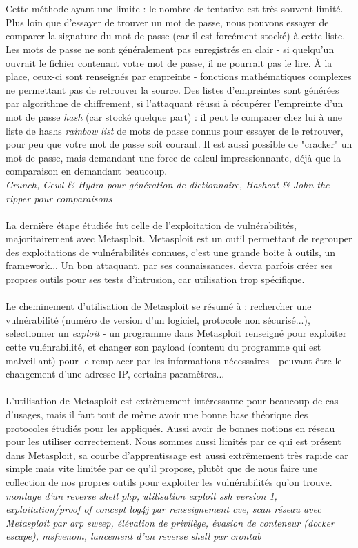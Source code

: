 \\ \\
Cette méthode ayant une limite : le nombre de tentative est très souvent limité. Plus loin que d'essayer de trouver un mot de passe, nous pouvons essayer de comparer la signature du mot de passe (car il est forcément stocké) à cette liste. Les mots de passe ne sont généralement pas enregistrés en clair - si quelqu'un ouvrait le fichier contenant votre mot de passe, il ne pourrait pas le lire. À la place, ceux-ci sont renseignés par empreinte - fonctions mathématiques complexes ne permettant pas de retrouver la source. Des listes d'empreintes sont générées par algorithme de chiffrement, si l'attaquant réussi à récupérer l'empreinte d'un mot de passe \textit{hash} (car stocké quelque part) : il peut le comparer chez lui à une liste de hashs \textit{rainbow list} de mots de passe connus pour essayer de le retrouver, pour peu que votre mot de passe soit courant. Il est aussi possible de "cracker" un mot de passe, mais demandant une force de calcul impressionnante, déjà que la comparaison en demandant beaucoup.
\\
\textit{Crunch, Cewl \& Hydra pour génération de dictionnaire, Hashcat \& John the ripper pour comparaisons}
\\ \\
La dernière étape étudiée fut celle de l'exploitation de vulnérabilités, majoritairement avec Metasploit. Metasploit est un outil permettant de regrouper des exploitations de vulnérabilités connues, c'est une grande boite à outils, un framework... Un bon attaquant, par ses connaissances, devra parfois créer ses propres outils pour ses tests d'intrusion, car utilisation trop spécifique.
\\ \\
Le cheminement d'utilisation de Metasploit se résumé à : rechercher une vulnérabilité (numéro de version d'un logiciel, protocole non sécurisé...), selectionner un \textit{exploit} - un programme dans Metasploit renseigné pour exploiter cette vulénrabilité, et changer son payload (contenu du programme qui est malveillant) pour le remplacer par les informations nécessaires - peuvant être le changement d'une adresse IP, certains paramètres...
\\ \\
L'utilisation de Metasploit est extrèmement intéressante pour beaucoup de cas d'usages, mais il faut tout de même avoir une bonne base théorique des protocoles étudiés pour les appliqués. Aussi avoir de bonnes notions en réseau pour les utiliser correctement. Nous sommes aussi limités par ce qui est présent dans Metasploit, sa courbe d'apprentissage est aussi extrêmement très rapide car simple mais vite limitée par ce qu'il propose, plutôt que de nous faire une collection de nos propres outils pour exploiter les vulnérabilités qu'on trouve.
\\
\textit{montage d'un reverse shell php, utilisation exploit ssh version 1, exploitation/proof of concept log4j par renseignement cve, scan réseau avec Metasploit par arp sweep, élévation de privilège, évasion de conteneur (docker escape), msfvenom, lancement d'un reverse shell par crontab}

